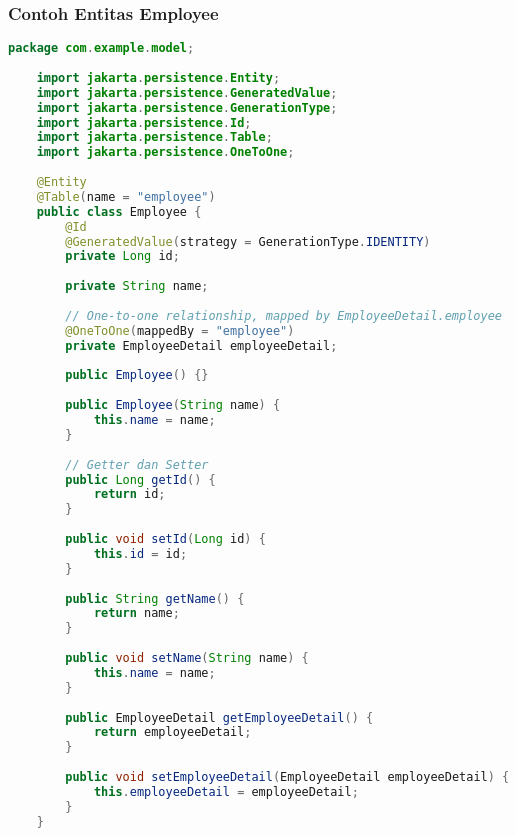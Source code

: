 \subsubsection*{Contoh Entitas Employee}
\begin{lstlisting}[language=Java, style=JavaStyle]
	package com.example.model;
	
	import jakarta.persistence.Entity;
	import jakarta.persistence.GeneratedValue;
	import jakarta.persistence.GenerationType;
	import jakarta.persistence.Id;
	import jakarta.persistence.Table;
	import jakarta.persistence.OneToOne;
	
	@Entity
	@Table(name = "employee")
	public class Employee {
		@Id
		@GeneratedValue(strategy = GenerationType.IDENTITY)
		private Long id;
		
		private String name;
		
		// One-to-one relationship, mapped by EmployeeDetail.employee
		@OneToOne(mappedBy = "employee")
		private EmployeeDetail employeeDetail;
		
		public Employee() {}
		
		public Employee(String name) {
			this.name = name;
		}
		
		// Getter dan Setter
		public Long getId() {
			return id;
		}
		
		public void setId(Long id) {
			this.id = id;
		}
		
		public String getName() {
			return name;
		}
		
		public void setName(String name) {
			this.name = name;
		}
		
		public EmployeeDetail getEmployeeDetail() {
			return employeeDetail;
		}
		
		public void setEmployeeDetail(EmployeeDetail employeeDetail) {
			this.employeeDetail = employeeDetail;
		}
	}
\end{lstlisting}


